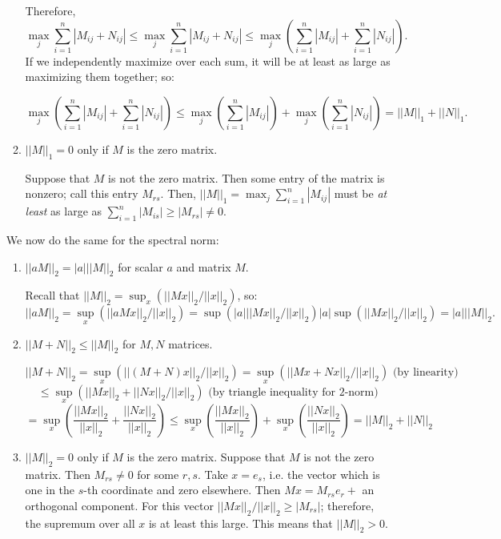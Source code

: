 \documentclass[12pt]{amsart}
\begin{document}
\begin{enumerate}
\begin{enumerate}
Therefore, 
\[ \max_{j} \sum_{i = 1}^n | M_{ij} + N_{ij}| \leq
\max_{j} \sum_{i = 1}^n |M_{ij} + N_{ij}| \leq \max_j \left(\sum_{i = 1}^n |M_{ij}|
+ \sum_{i = 1}^n |N_{ij}|\right).\]
 If we independently maximize over each
sum, it will be at least as large as maximizing them together; so:

\[ \max_j \left(\sum_{i = 1}^n |M_{ij}|
+ \sum_{i = 1}^n |N_{ij}|\right) \leq 
\max_j \left(\sum_{i = 1}^n |M_{ij}|\right)
+ \max_j\left( \sum_{i = 1}^n |N_{ij}|\right) = ||M||_1 + ||N||_1.
\]

\item $||M||_1 = 0$ only if $M$ is the zero matrix.

Suppose that $M$ is not the zero matrix. Then some entry
of the matrix is nonzero; call this entry $M_{rs}$. Then,
$||M||_1 = \max_j \sum_{i = 1}^n |M_{ij}|$ must be {\em at least} 
as large as $\sum_{i = 1}^n |M_{is}| \geq |M_{rs}| \neq 0$.
\end{enumerate}


We now do the same for the spectral norm:

\begin{enumerate}
\item $||a M||_2= |a| ||M||_2$ for scalar $a$ and matrix $M$.

Recall that $||M||_2 = \sup_x(||Mx||_2 /||x||_2)$, so:
\[||a M||_2= \sup_x(||aMx||_2 /||x||_2) = \sup(|a| ||Mx||_2 /||x||_2)
|a| \sup(||Mx||_2 /||x||_2) = |a| ||M||_2.
\]

\item $||M + N||_2 \leq ||M||_2 $ for $M,N$ matrices.  

\[||M+ N||_2= \sup_x(||(M+N)x||_2 /||x||_2) = \sup_x(||Mx + Nx||_2 /||x||_2) \text{  (by linearity)}\]
\[ \leq \sup_x(||Mx||_2 + ||Nx||_2 /||x||_2) \text{ (by triangle inequality for $2$-norm)}
\]
\[ = \sup_x \left(\dfrac{||Mx||_2}{||x||_2} + \dfrac{||Nx||_2}{||x||_2} \right) \leq 
\sup_x \left(\dfrac{||Mx||_2}{||x||_2} \right) +\sup_x\left( \dfrac{||Nx||_2}{||x||_2} \right) = ||M||_2 + ||N||_2
\]
\item $||M||_2 = 0$ only if $M$ is the zero matrix.
Suppose that $M$ is not the zero matrix. Then $M_{rs} \neq 0$ for some $r,s$.
Take $x = e_s$, i.e. the vector which is one in the $s$-th coordinate and
zero elsewhere. Then $Mx = M_{rs} e_r +$ an orthogonal component. For this vector
$||Mx||_2/||x||_2 \geq |M_{rs}|$; therefore, the supremum over all $x$ is at
least this large. This means that $||M||_2 > 0$.
\end{enumerate}


\end{enumerate}
\end{document}
